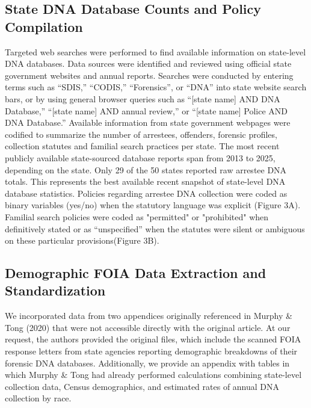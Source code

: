 \documentclass{article}
\begin{document}
\subsection*{State DNA Database Counts and Policy Compilation}
Targeted web searches were performed to find available information on state-level DNA databases. Data sources were identified and reviewed using official state government websites and annual reports. Searches were conducted by entering terms such as ``SDIS,'' ``CODIS,'' ``Forensics'', or ``DNA'' into state website search bars, or by using general browser queries such as ``[state name] AND DNA Database,'' ``[state name] AND annual review,'' or ``[state name] Police AND DNA Database.'' Available information from state government webpages were codified to summarize the number of arrestees, offenders, forensic profiles, collection statutes and familial search practices per state. The most recent publicly available state-sourced database reports span from 2013 to 2025, depending on the state. Only 29 of the 50 states reported raw arrestee DNA totals. This represents the best available recent snapshot of state-level DNA database statistics. Policies regarding arrestee DNA collection were coded as binary variables (yes/no) when the statutory language was explicit (Figure 3A). Familial search policies were coded as "permitted" or "prohibited" when definitively stated or as ``unspecified'' when the statutes were silent or ambiguous on these particular provisions(Figure 3B).

\subsection*{Demographic FOIA Data Extraction and Standardization}

We incorporated data from two appendices originally referenced in Murphy \& Tong (2020) that were not accessible directly with the original article. At our request, the authors provided the original files, which include the scanned FOIA response letters from state agencies reporting demographic breakdowns of their forensic DNA databases. Additionally, we provide an appendix with tables in which Murphy \& Tong had already performed calculations combining state-level collection data, Census demographics, and estimated rates of annual DNA collection by race.
\end{document}

